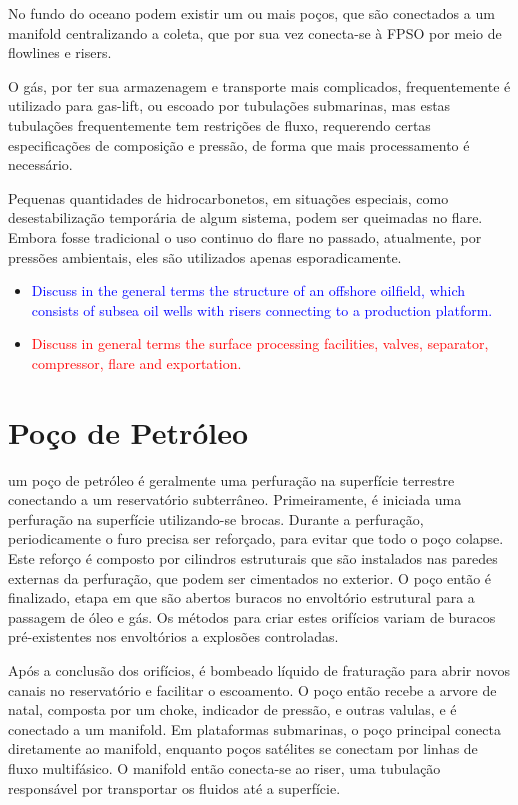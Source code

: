 No fundo do oceano podem existir um ou mais poços, que são conectados a um manifold centralizando a coleta, que por sua vez conecta-se à FPSO por meio de flowlines e risers.

O gás, por ter sua armazenagem e transporte mais complicados, frequentemente é utilizado para gas-lift, ou escoado por tubulações submarinas, mas estas tubulações frequentemente tem restrições de fluxo, requerendo certas especificações de composição e pressão, de forma que mais processamento é necessário.

Pequenas quantidades de hidrocarbonetos, em situações especiais, como desestabilização temporária de algum sistema, podem ser queimadas no flare. Embora fosse tradicional o uso continuo do flare no passado, atualmente, por pressões ambientais, eles são utilizados apenas esporadicamente.

\begin{itemize}

\item \textcolor{blue}{Discuss in the general terms the structure of an offshore oilfield, which consists of subsea oil wells with risers connecting to a production platform.}


\item \textcolor{red}{Discuss in general terms the surface processing facilities, valves, separator, compressor, flare and exportation.}

\end{itemize}



\section{Poço de Petróleo}

um poço de petróleo é geralmente uma perfuração na superfície terrestre conectando a um reservatório subterrâneo. 
%
Primeiramente, é iniciada uma perfuração na superfície utilizando-se brocas. 
%
Durante a perfuração, periodicamente o furo precisa ser reforçado, para evitar que todo o poço colapse. 
%
Este reforço é composto por cilindros estruturais que são instalados nas paredes externas da perfuração, que podem ser cimentados no exterior. 
%
O poço então é finalizado, etapa em que são abertos buracos no envoltório estrutural para a passagem de óleo e gás. 
%
Os métodos para criar estes orifícios variam de buracos pré-existentes nos envoltórios a explosões controladas.
%


Após a conclusão dos orifícios, é bombeado líquido de fraturação para abrir novos canais no reservatório e facilitar o escoamento.
%
O poço então recebe a arvore de natal, composta por um choke, indicador de pressão, e outras valulas, e é conectado a um manifold.
%
Em plataformas submarinas, o poço principal conecta diretamente ao manifold, enquanto poços satélites se conectam por linhas de fluxo multifásico.
%
O manifold então conecta-se ao riser, uma tubulação responsável por transportar os fluidos até a superfície.
%


